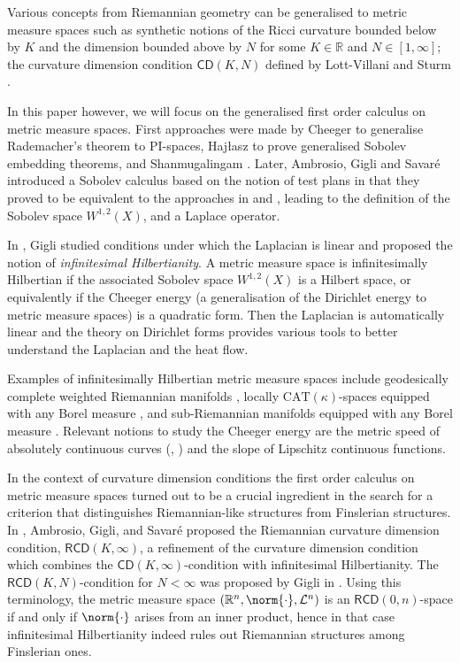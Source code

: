 \documentclass[a4paper,10pt]{article}
\numberwithin{equation}{section}
\newcommand{\R}{\mathbb{R}}
\newcommand{\cd}{\mathsf{CD}}
\newcommand{\rcd}{\mathsf{RCD}}
\begin{document}
Various concepts from Riemannian geometry can be generalised to metric measure spaces such as synthetic notions of the Ricci curvature bounded below by $K$ and the dimension bounded above by $N$ for some $K \in \R$ and $N \in [1, \infty]$; the curvature dimension condition $\cd(K, N)$ defined by Lott-Villani \cite{lott2009ricci, LottVillaniJFA} and Sturm \cite{sturm2006geometryI, sturm2006geometryII}.    

In this paper however, we will focus on the generalised first order calculus on metric measure spaces.
First approaches were made by Cheeger \cite{cheeger1999differentiability} to generalise Rademacher's theorem to PI-spaces, Haj\l{}asz \cite{hajlasz1996sobolev} to prove generalised Sobolev embedding theorems, and Shanmugalingam \cite{shanmugalingam2000newtonian}. 
Later, Ambrosio, Gigli and Savaré introduced a Sobolev calculus based on the notion of test plans in \cite{ambrosio2014inventio} that they proved to be equivalent to the approaches in \cite{cheeger1999differentiability} and \cite{shanmugalingam2000newtonian}, leading to the definition of the Sobolev space $W^{1,2}(X)$, and a Laplace operator. 

In \cite{gigli2015differential}, Gigli studied conditions under which the Laplacian is linear and proposed the notion of \textit{infinitesimal Hilbertianity}. A metric measure space is infinitesimally Hilbertian if the associated Sobolev space $W^{1,2}(X)$ is a Hilbert space, or equivalently if the Cheeger energy (a generalisation of the Dirichlet energy to metric measure spaces) is a quadratic form. Then the Laplacian is automatically linear and the theory on Dirichlet forms provides various tools to better understand the Laplacian and the heat flow.   
 
Examples of infinitesimally Hilbertian metric measure spaces include geodesically complete weighted Riemannian manifolds \cite{luvcic2020infinitesimal}, locally $\mathrm{CAT}(\kappa)$-spaces equipped with any Borel measure  \cite{di2021infinitesimal}, and sub-Riemannian manifolds equipped with any Borel measure \cite{le2023universal}.
Relevant notions to study the Cheeger energy are the metric speed of absolutely continuous curves (\cite{ambrosio1990metric}, \cite{kirchheim1994rectifiable}) and the slope of Lipschitz continuous functions. 

In the context of curvature dimension conditions the first order calculus on metric measure spaces turned out to be a crucial ingredient in the search for a criterion that distinguishes Riemannian-like structures from Finslerian structures.
In \cite{ambrosio2014duke}, Ambrosio, Gigli, and Savaré proposed the Riemannian curvature dimension condition, $\rcd(K, \infty)$, a refinement of the curvature dimension condition which combines the $\cd(K, \infty)$-condition with infinitesimal Hilbertianity.
The $\rcd(K, N)$-condition for $N<\infty$ was proposed by Gigli in \cite{gigli2014overview}. 
Using this terminology, the metric measure space $(\R^n, \norm{\cdot}, \mathcal{L}^n)$ is an $\rcd(0, n)$-space if and only if $\norm{\cdot}$ arises from an inner product, hence in that case infinitesimal Hilbertianity indeed rules out Riemannian structures among Finslerian ones.
\end{document}
